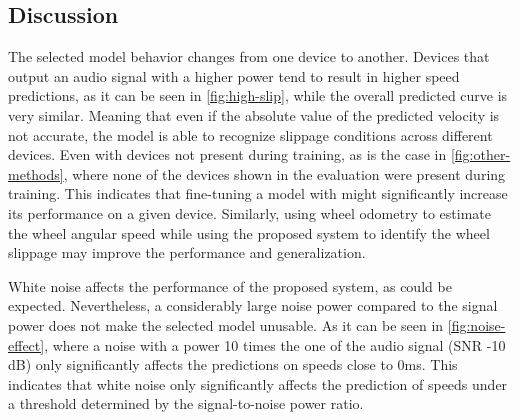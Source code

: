 \subsection{Discussion} \label{subsec:discussion}

\balance

The selected model behavior changes from one device to another. Devices that
output an audio signal with a higher power tend to result in higher speed
predictions, as it can be seen in \cref{fig:high-slip}, while the overall
predicted curve is very similar. Meaning that even if the absolute value of the
predicted velocity is not accurate, the model is able to recognize slippage
conditions across different devices. Even with devices not present during
training, as is the case in \cref{fig:other-methods}, where none of the devices
shown in the evaluation were present during training. This indicates that
fine-tuning \cite{TL2016} a model with might significantly increase its
performance on a given device. Similarly, using wheel odometry to estimate the
wheel angular speed while using the proposed system to identify the wheel
slippage may improve the performance and generalization.


White noise affects the performance of the proposed system, as could
be expected. Nevertheless, a considerably large noise power compared to the
signal power does not make the selected model unusable. As it can be seen in
\cref{fig:noise-effect}, where a noise with a power 10 times the one of the
audio signal (SNR -10 dB) only significantly affects the predictions on
speeds close to 0ms. This indicates that white noise only significantly affects
the prediction of speeds under a threshold determined by the signal-to-noise
power ratio.


